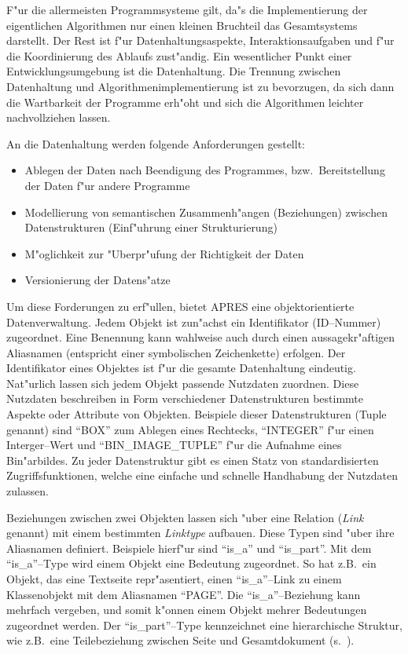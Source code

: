 F"ur die allermeisten Programmsysteme gilt, da"s die Implementierung der eigentlichen Algorithmen
nur einen kleinen Bruchteil das Gesamtsystems darstellt. Der Rest ist f"ur Datenhaltungsaspekte,
Interaktionsaufgaben und f"ur die Koordinierung des Ablaufs zu\-st"an\-dig.
Ein wesentlicher Punkt einer Entwicklungsumgebung ist die Datenhaltung. Die
Trennung zwischen Datenhaltung und Algorithmenimplementierung ist zu bevorzugen, da sich dann
die Wartbarkeit der Programme erh"oht und sich die Algorithmen leichter nachvollziehen lassen.

An die Datenhaltung werden folgende Anforderungen gestellt:
\begin{itemize}
  \item Ablegen der Daten nach Beendigung des Programmes, bzw.\ Bereitstellung der Daten f"ur
  andere Programme
  \item Modellierung von semantischen Zusammenh"angen (Beziehungen) zwischen Datenstrukturen 
  (Einf"uhrung einer Strukturierung)
  \item M"oglichkeit zur "Uberpr"ufung der Richtigkeit der Daten
  \item Versionierung der Datens"atze
\end{itemize}

Um diese Forderungen zu erf"ullen, bietet APRES eine objektorientierte Datenverwaltung. Jedem Objekt
ist zun"achst ein Identifikator (ID--Nummer) zugeordnet. Eine Benennung kann wahlweise 
auch durch einen aussagekr"aftigen Aliasnamen (entspricht einer symbolischen Zeichenkette) erfolgen.
Der Identifikator eines Objektes ist f"ur die
gesamte Datenhaltung eindeutig. Nat"urlich lassen sich jedem Objekt passende
Nutzdaten zuordnen. Diese Nutzdaten beschreiben in Form verschiedener Datenstrukturen bestimmte
Aspekte oder Attribute von Objekten. Beispiele dieser Datenstrukturen (Tuple genannt) sind
"`BOX"' zum Ablegen eines Rechtecks, "`INTEGER"' f"ur einen Interger--Wert
und "`BIN\_IMAGE\_TUPLE"' f"ur die Aufnahme eines
Bin"arbildes. Zu jeder Datenstruktur gibt es einen Statz von standardisierten Zugriffsfunktionen,
welche eine einfache und schnelle Handhabung der Nutzdaten zulassen.

Beziehungen zwischen zwei Objekten lassen sich "uber eine Relation ({\em Link\/} genannt)
mit einem bestimmten {\em Linktype\/} aufbauen. Diese Typen sind "uber ihre Aliasnamen definiert.
Beispiele hierf"ur sind "`is\_a"' und "`is\_part"'. Mit dem "`is\_a"'--Type wird einem Objekt eine
Bedeutung zugeordnet.
So hat z.B.\ ein Objekt, das eine Textseite repr"asentiert, einen "`is\_a"'--Link zu einem
Klassenobjekt mit dem Aliasnamen "`PAGE"'. Die "`is\_a"'--Beziehung kann mehrfach vergeben, 
und somit k"onnen einem Objekt mehrer Bedeutungen zugeordnet werden. Der "`is\_part"'--Type kennzeichnet 
eine hierarchische Struktur, wie z.B.\ eine Teilebeziehung zwischen Seite und Gesamtdokument 
(s.\ ).

